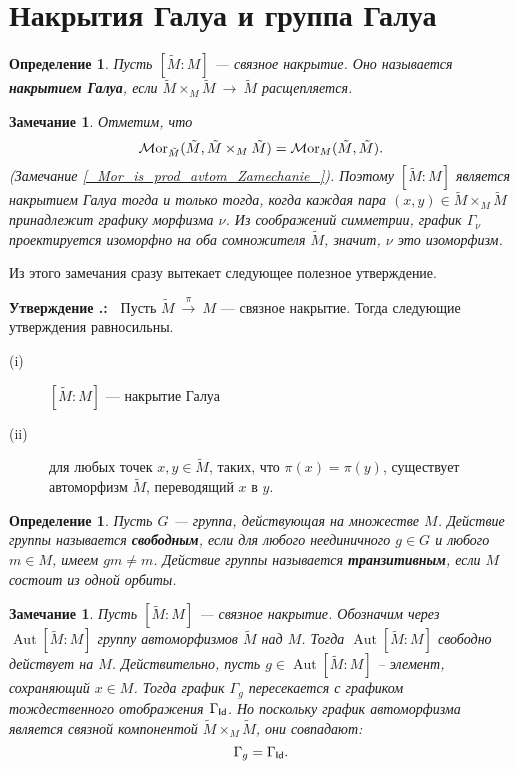 \documentclass[12pt]{book}
\newcommand{\arrow}{{\:\longrightarrow\:}}
\def\endproof{\hbox{\vrule width 5pt height 5pt depth 0pt}}
\def\Id{{\operatorname{\sf Id}}}
\def\Aut{\operatorname{Aut}}
\newcommand{\Mor}{\operatorname{{\cal M}or}}
\theoremstyle{upshape}
\newtheorem{zadacha}{Задача}[chapter]
\theoremstyle{generic}
\newtheorem{opredelenie}[teorema]{Определение}
\newtheorem{remark}[teorema]{Замечание}
\def\замечание{\begin{remark}}
\def\еза{\end{remark}}
\theoremstyle{upshapenonumber}
\newtheorem{ukazanie}{Указание}[section]
\newcommand{\следствие}{%
     \refstepcounter{teorema}
     {\noindent\bf Следствие \thechapter.\arabic{teorema}:\ }}
\newcommand{\пример}{%
     \refstepcounter{teorema}
     {\noindent\bf Пример \thechapter.\arabic{teorema}:\ }}
\newcommand{\лемма}{%
     \refstepcounter{teorema}
     {\noindent\bf Лемма \thechapter.\arabic{teorema}:\ }}
\newcommand{\теорема}{%
     \refstepcounter{teorema}
     {\noindent\bf Теорема \thechapter.\arabic{teorema}:\ }}
\newcommand{\утверждение}{%
     \refstepcounter{teorema}
     {\noindent\bf Утверждение \thechapter.\arabic{teorema}:\ }}
\def\хфилл{\hfill}
\def\бф{\bf}
\def\ем{\em}
\def\задача{\begin{zadacha}}
\def\ез{\end{zadacha}}
\def\указание{\begin{ukazanie}}
\def\еу{\end{ukazanie}}
\def\определение{\begin{opredelenie}}
\def\ео{\end{opredelenie}}
\def\енум{\begin{enumerate}}
\def\ее{\end{enumerate}}
\begin{document}

\section{Накрытия Галуа и группа Галуа}


\определение
Пусть $[\tilde M: M ]$ --- связное накрытие.
Оно называется {\бф накрытием Галуа}, если
$\tilde M \times_M \tilde M \arrow \tilde M$
расщепляется. 
\ео

\замечание
Отметим, что 
\[
\Mor_{\tilde M}(\tilde M, \tilde M\times_M \tilde M) =
\Mor_M(\tilde M, \tilde M).
\]
(Замечание \ref{_Mor_is_prod_avtom_Zamechanie_}).
Поэтому $[\tilde M: M ]$ 
является накрытием Галуа
тогда и только тогда,
когда каждая пара $(x, y) \in \tilde M\times_M \tilde M$
принадлежит графику морфизма $\nu$. Из соображений
симметрии, график $\Gamma_\nu$ проектируется
изоморфно на оба сомножителя $\tilde M$,
значит, $\nu$ это изоморфизм.
\еза

Из этого замечания сразу вытекает следующее
полезное утверждение.

\хфилл

\утверждение\label{_Gal_nakr_aut_Utverzhdenie_}
Пусть $\tilde M \stackrel\pi \arrow M$ --- связное накрытие.
Тогда следующие утверждения равносильны.
\begin{description}
\item[(i)] $[\tilde M: M ]$ --- накрытие Галуа
\item[(ii)] для любых точек $x, y \in \tilde M$,
таких, что $\pi(x)=\pi(y)$, существует
автоморфизм $\tilde M$, переводящий $x$ в $y$.
\end{description}
\endproof

\определение
Пусть $G$ --- группа, действующая на множестве $M$.
Действие группы называется {\бф свободным}, если
для любого неединичного $g\in G$ и любого $m \in M$,
имеем $gm\neq m$.
Действие группы называется {\бф транзитивным},
если $M$ состоит из одной орбиты.
\ео

\замечание
Пусть $[\tilde M:M]$ --- связное накрытие.
Обозначим через $\Aut [\tilde M:M]$
группу автоморфизмов $\tilde M$ над $M$.
Тогда $\Aut [\tilde M:M]$ свободно действует на
$M$. Действительно, пусть $g\in \Aut [\tilde M:M]$ --
элемент, сохраняющий $x\in M$. Тогда график 
$\Gamma_g$ пересекается с графиком тождественного
отображения $\Gamma_\Id$. Но поскольку график автоморфизма
является связной компонентой 
$\tilde M\times_M \tilde M$, они совпадают:\[ \Gamma_g=\Gamma_\Id.\]
\еза
\end{document}
